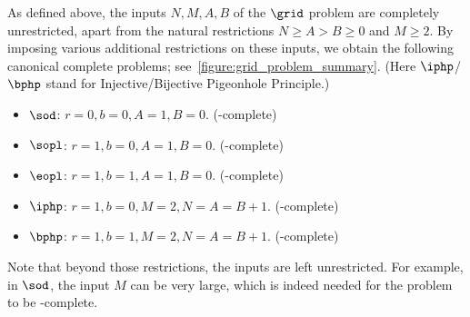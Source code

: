 As defined above, the inputs $N, M, A, B$ of the $\grid$ problem are completely unrestricted, apart from the natural restrictions $N \geq A > B \geq 0$ and $M \geq 2$. By imposing various additional restrictions on these inputs, we obtain the following canonical complete problems; see~\cref{figure:grid_problem_summary}. (Here $\iphp$/$\bphp$ stand for Injective/Bijective Pigeonhole Principle.)
\begin{itemize}
    \item $\sod$: $r=0, b=0, A=1, B=0$. (\PLS-complete)
    \item $\sopl$: $r=1, b=0, A=1, B=0$. (\SOPL-complete)
    \item $\eopl$: $r=1, b=1, A=1, B=0$. (\EOPL-complete)
    \item $\iphp$: $r=1, b=0, M=2, N=A=B+1$. (\PPADS-complete)
    \item $\bphp$: $r=1, b=1, M=2, N=A=B+1$. (\PPAD-complete)
\end{itemize}
Note that beyond those restrictions, the inputs are left unrestricted. For example, in $\sod$, the input $M$ can be very large, which is indeed needed for the problem to be \PLS-complete.



